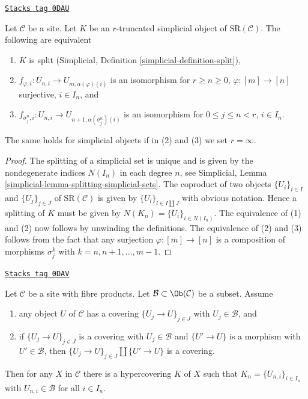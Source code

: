 \begin{lemma}[Split]
\label{hypercovering-lemma-split}
\href{https://stacks.math.columbia.edu/tag/0DAU}{\texttt{Stacks tag 0DAU}}

Let $\mathcal{C}$ be a site. Let $K$ be an $r$-truncated simplicial object
of $\text{SR}(\mathcal{C})$. The following are equivalent
\begin{enumerate}
\item $K$ is split (Simplicial, Definition \ref{simplicial-definition-split}),
\item $f_{\varphi, i} : U_{n, i} \to U_{m, \alpha(\varphi)(i)}$
is an isomorphism for $r \geq n \geq 0$,
$\varphi : [m] \to [n]$ surjective, $i \in I_n$, and
\item $f_{\sigma^n_j, i} : U_{n, i} \to U_{n + 1, \alpha(\sigma^n_j)(i)}$
is an isomorphism for $0 \leq j \leq n < r$, $i \in I_n$.
\end{enumerate}
The same holds for simplicial objects if in (2) and (3)
we set $r = \infty$.
\end{lemma}

\begin{proof}
The splitting of a simplicial set is unique and is given by
the nondegenerate indices $N(I_n)$ in each degree $n$, see
Simplicial, Lemma \ref{simplicial-lemma-splitting-simplicial-sets}.
The coproduct of two objects $\{U_i\}_{i \in I}$ and $\{U_j\}_{j \in J}$
of $\text{SR}(\mathcal{C})$ is given by $\{U_l\}_{l \in I \amalg J}$
with obvious notation. Hence a splitting of $K$ must be given by
$N(K_n) = \{U_i\}_{i \in N(I_n)}$. The equivalence of (1) and (2)
now follows by unwinding the definitions. The equivalence of (2)
and (3) follows from the fact that any surjection
$\varphi : [m] \to [n]$ is a composition of morphisms
$\sigma^k_j$ with $k = n, n + 1, \ldots, m - 1$.
\end{proof}

\begin{lemma}
\label{hypercovering-lemma-hypercovering-object}
\href{https://stacks.math.columbia.edu/tag/0DAV}{\texttt{Stacks tag 0DAV}}

Let $\mathcal{C}$ be a site with fibre products.
Let $\mathcal{B} \subset \Ob(\mathcal{C})$ be a subset.
Assume
\begin{enumerate}
\item any object $U$ of $\mathcal{C}$ has a covering
$\{U_j \to U\}_{j \in J}$ with $U_j \in \mathcal{B}$, and
\item if $\{U_j \to U\}_{j \in J}$ is a covering
with $U_j \in \mathcal{B}$ and $\{U' \to U\}$ is a morphism with
$U' \in \mathcal{B}$, then $\{U_j \to U\}_{j \in J} \amalg \{U' \to U\}$
is a covering.
\end{enumerate}
Then for any $X$ in $\mathcal{C}$ there is a hypercovering $K$
of $X$ such that $K_n = \{U_{n, i}\}_{i \in I_n}$
with $U_{n, i} \in \mathcal{B}$ for all $i \in I_n$.
\end{lemma}

